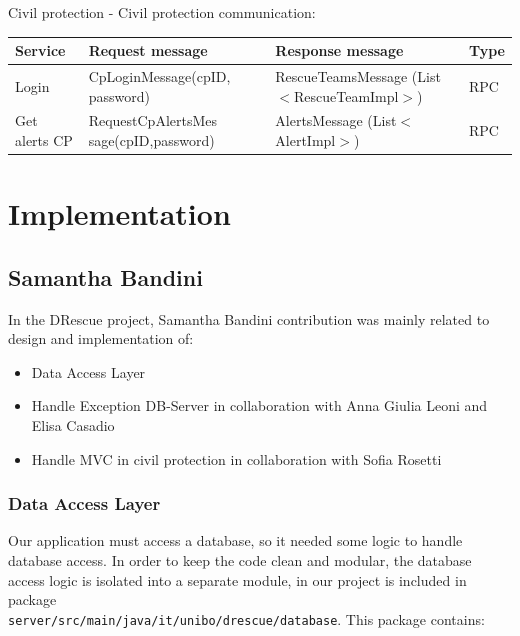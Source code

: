 \documentclass[a4paper,12pt]{report}
\begin{document}
Civil protection - Civil protection communication:

\begin{center}
\begin{tabular}{ |p{4cm}|p{4cm}|p{4cm}|p{2cm}| } \hline
Service 			& Request message 	& Response message		& Type 	\\
\hline
Login	& CpLoginMessage(cpID, password)	& RescueTeamsMessage (List$<$RescueTeamImpl$>$) 	& RPC	\\ 
Get alerts CP	& RequestCpAlertsMes sage(cpID,password)	& AlertsMessage (List$<$AlertImpl$>$) 	& RPC	\\ 
\hline
\end{tabular}
\end{center}


\chapter{Implementation}

\section{Samantha Bandini}
In the DRescue project, Samantha Bandini contribution was mainly related to design and implementation of:
\begin{itemize}
\item Data Access Layer 
\item Handle Exception DB-Server in collaboration with Anna Giulia Leoni and Elisa Casadio
\item Handle MVC in civil protection in collaboration with Sofia Rosetti
\end{itemize}

\subsection{Data Access Layer}

Our application must access a database, so it needed some logic to handle database access. In order to keep the code clean and modular, the database access logic is isolated into a separate module, in our project is included in package\\ \texttt{server/src/main/java/it/unibo/drescue/database}. This package contains:\\
\end{document}
